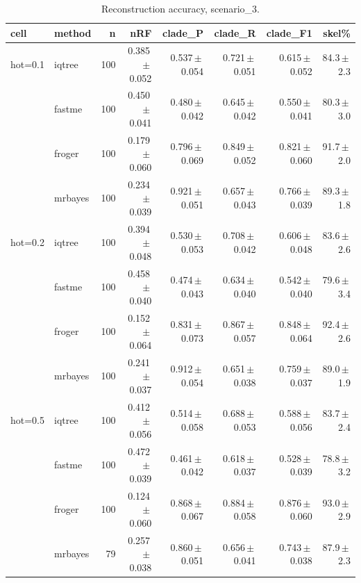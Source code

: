 \begin{table}[t]
\centering
\caption{Reconstruction accuracy, scenario\_3.}
\label{tab:scenario3}
\begin{tabular}{ll r rrrrr}
\toprule
cell & method & n & nRF & clade\_P & clade\_R & clade\_F1 & skel\% \\
\midrule
hot=0.1 & iqtree & 100 & 0.385\,$\pm$\,0.052 & 0.537\,$\pm$\,0.054 & 0.721\,$\pm$\,0.051 & 0.615\,$\pm$\,0.052 & 84.3\,$\pm$\,2.3 \\
 & fastme & 100 & 0.450\,$\pm$\,0.041 & 0.480\,$\pm$\,0.042 & 0.645\,$\pm$\,0.042 & 0.550\,$\pm$\,0.041 & 80.3\,$\pm$\,3.0 \\
 & froger & 100 & 0.179\,$\pm$\,0.060 & 0.796\,$\pm$\,0.069 & 0.849\,$\pm$\,0.052 & 0.821\,$\pm$\,0.060 & 91.7\,$\pm$\,2.0 \\
 & mrbayes & 100 & 0.234\,$\pm$\,0.039 & 0.921\,$\pm$\,0.051 & 0.657\,$\pm$\,0.043 & 0.766\,$\pm$\,0.039 & 89.3\,$\pm$\,1.8 \\
hot=0.2 & iqtree & 100 & 0.394\,$\pm$\,0.048 & 0.530\,$\pm$\,0.053 & 0.708\,$\pm$\,0.042 & 0.606\,$\pm$\,0.048 & 83.6\,$\pm$\,2.6 \\
 & fastme & 100 & 0.458\,$\pm$\,0.040 & 0.474\,$\pm$\,0.043 & 0.634\,$\pm$\,0.040 & 0.542\,$\pm$\,0.040 & 79.6\,$\pm$\,3.4 \\
 & froger & 100 & 0.152\,$\pm$\,0.064 & 0.831\,$\pm$\,0.073 & 0.867\,$\pm$\,0.057 & 0.848\,$\pm$\,0.064 & 92.4\,$\pm$\,2.6 \\
 & mrbayes & 100 & 0.241\,$\pm$\,0.037 & 0.912\,$\pm$\,0.054 & 0.651\,$\pm$\,0.038 & 0.759\,$\pm$\,0.037 & 89.0\,$\pm$\,1.9 \\
hot=0.5 & iqtree & 100 & 0.412\,$\pm$\,0.056 & 0.514\,$\pm$\,0.058 & 0.688\,$\pm$\,0.053 & 0.588\,$\pm$\,0.056 & 83.7\,$\pm$\,2.4 \\
 & fastme & 100 & 0.472\,$\pm$\,0.039 & 0.461\,$\pm$\,0.042 & 0.618\,$\pm$\,0.037 & 0.528\,$\pm$\,0.039 & 78.8\,$\pm$\,3.2 \\
 & froger & 100 & 0.124\,$\pm$\,0.060 & 0.868\,$\pm$\,0.067 & 0.884\,$\pm$\,0.058 & 0.876\,$\pm$\,0.060 & 93.0\,$\pm$\,2.9 \\
 & mrbayes & 79 & 0.257\,$\pm$\,0.038 & 0.860\,$\pm$\,0.051 & 0.656\,$\pm$\,0.041 & 0.743\,$\pm$\,0.038 & 87.9\,$\pm$\,2.3 \\
\bottomrule
\end{tabular}
\end{table}